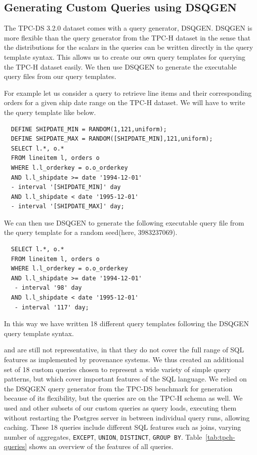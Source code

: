\begin{toappendix}
	\section{Generating Custom Queries using DSQGEN}
	The TPC-DS 3.2.0 dataset comes with a query generator, DSQGEN. DSQGEN
	is more flexible than the query generator from the TPC-H dataset in the sense that
	the distributions for the scalars in the queries can be written directly in the query template syntax. This allows
	us to create our own query templates for querying the TPC-H dataset easily. We then use DSQGEN to
	generate the executable query files from our query templates.

	For example let us consider a query to retrieve line items and their corresponding orders for a given ship date range on the TPC-H dataset. We will have to write the
	query template like below.
	\begin{verbatim}
  DEFINE SHIPDATE_MIN = RANDOM(1,121,uniform);
  DEFINE SHIPDATE_MAX = RANDOM([SHIPDATE_MIN],121,uniform);
  SELECT l.*, o.*
  FROM lineitem l, orders o
  WHERE l.l_orderkey = o.o_orderkey
  AND l.l_shipdate >= date '1994-12-01'
  - interval '[SHIPDATE_MIN]' day
  AND l.l_shipdate < date '1995-12-01'
  - interval '[SHIPDATE_MAX]' day;
  \end{verbatim}

	We can then use DSQGEN to generate the following executable query file from the query template for a random seed(here, 3983237069).
	\begin{verbatim}
  SELECT l.*, o.*
  FROM lineitem l, orders o
  WHERE l.l_orderkey = o.o_orderkey
  AND l.l_shipdate >= date '1994-12-01'
   - interval '98' day
  AND l.l_shipdate < date '1995-12-01'
   - interval '117' day;
  \end{verbatim}
	In this way we have written 18 different query templates following the DSQGEN query
	template syntax.
\end{toappendix}

\qtpc{} and \qtpce{} are still not representative, in that they do not cover the
full range of SQL features as implemented by provenance systems. We thus
created an additional set \qcust{} of 18 custom queries chosen to represent a wide variety of
simple query patterns, but which cover important features of the SQL language. We relied on the DSQGEN query generator from
the TPC-DS benchmark for generation because of its flexibility, but the queries are on the TPC-H
schema as well. We used \qcust{} and other subsets of our custom queries as query loads, executing them without restarting the Postgres server in between individual query runs, allowing caching.
These 18 queries include different SQL features
such as joins, varying number of aggregates, \texttt{EXCEPT}, \texttt{UNION}, \texttt{DISTINCT}, \texttt{GROUP BY}.
Table~\ref{tab:tpch-queries} shows an overview of the features of all
queries.

